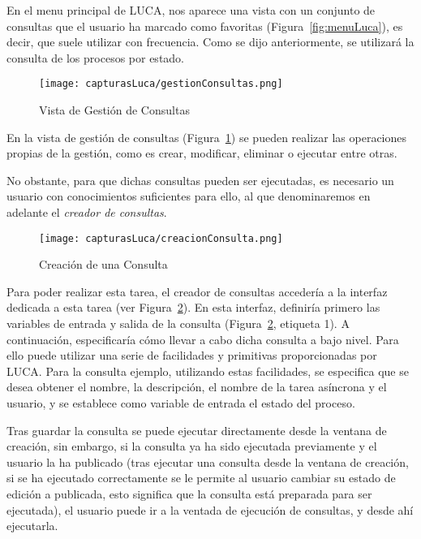 En el menu principal de LUCA, nos aparece una vista con un conjunto de consultas que el usuario ha marcado como favoritas (Figura~\ref{fig:menuLuca}), es decir, que suele utilizar con frecuencia. Como se dijo anteriormente, se utilizará la consulta de los procesos por estado.

\begin{figure}[!tb]
	\centering
	\texttt{[image: capturasLuca/gestionConsultas.png]}
	\caption{Vista de Gestión de Consultas}
	\label{fig:gestionConsultas}
\end{figure}

En la vista de gestión de consultas (Figura~\ref{fig:gestionConsultas}) se pueden realizar las operaciones propias de la gestión, como es crear, modificar, eliminar o ejecutar entre otras.

No obstante, para que dichas consultas pueden ser ejecutadas, es necesario un usuario con conocimientos suficientes para ello, al que denominaremos en adelante el \emph{creador de consultas}.

\begin{figure}[!tb]
	\centering
	\texttt{[image: capturasLuca/creacionConsulta.png]}
	\caption{Creación de una Consulta}
	\label{fig:creacionConsulta}
\end{figure}

Para poder realizar esta tarea, el creador de consultas accedería a la interfaz dedicada a esta tarea (ver Figura~\ref{fig:creacionConsulta}). En esta interfaz, definiría primero las variables de entrada y salida de la consulta (Figura~\ref{fig:creacionConsulta}, etiqueta 1). A continuación, especificaría cómo llevar a cabo dicha consulta a bajo nivel. Para ello puede utilizar una serie de facilidades y primitivas proporcionadas por LUCA. Para la consulta ejemplo, utilizando estas facilidades, se especifica que se desea obtener el nombre, la descripción, el nombre de la tarea asíncrona y el usuario, y se establece como variable de entrada el estado del proceso.

Tras guardar la consulta se puede ejecutar directamente desde la ventana de creación, sin embargo, si la consulta ya ha sido ejecutada previamente y el usuario la ha publicado (tras ejecutar una consulta desde la ventana de creación, si se ha ejecutado correctamente se le permite al usuario cambiar su estado de edición a publicada, esto significa que la consulta está preparada para ser ejecutada), el usuario puede ir a la ventada de ejecución de consultas, y desde ahí ejecutarla.

